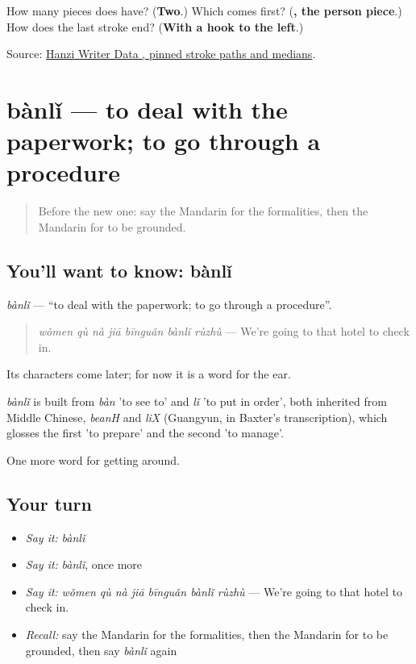 \begin{tcolorbox}[breakable,colback=teal!4,colframe=teal!35!black,title={Before you move on}]
How many pieces does  have? (\textbf{Two}.) Which comes first? (\textbf{, the person piece}.) How does the last stroke end? (\textbf{With a hook to the left}.)

Source: \href{https://raw.githubusercontent.com/chanind/hanzi-writer-data/68d10a4b21150cae5e1ebbd223eed289cf32d90c/data/\%E5\%81\%9C.json}{Hanzi Writer Data , pinned stroke paths and medians}.
\end{tcolorbox}
\section[bànlǐ]{bànlǐ — to deal with the paperwork; to go through a procedure}

\label{lesson:ZH-C418-banli}



\begin{quote}
Before the new one: say the Mandarin for the formalities, then the Mandarin for to be grounded.
\end{quote}

\subsection*{You'll want to know: bànlǐ}
\emph{bànlǐ} — \textquotedblleft{}to deal with the paperwork; to go through a procedure\textquotedblright{}.

\begin{quote}
\emph{wǒmen qù nà jiā bīnguǎn bànlǐ rùzhù} — We're going to that hotel to check in.
\end{quote}

Its characters come later; for now it is a word for the ear.

\begin{cousinweb}
\emph{bànlǐ} is built from \emph{bàn} 'to see to' and \emph{lǐ} 'to put in order', both inherited from Middle Chinese, \emph{beanH} and \emph{liX} (Guangyun, in Baxter's transcription), which glosses the first 'to prepare' and the second 'to manage'.
\end{cousinweb}

\begin{grammarlens}[title={What you've built}]
One more word for getting around.
\end{grammarlens}

\subsection*{Your turn}
\begin{itemize}
\raggedright
  \item \emph{Say it:} \emph{bànlǐ}
  \item \emph{Say it:} \emph{bànlǐ}, once more
  \item \emph{Say it:} \emph{wǒmen qù nà jiā bīnguǎn bànlǐ rùzhù} — We're going to that hotel to check in.
  \item \emph{Recall:} say the Mandarin for the formalities, then the Mandarin for to be grounded, then say \emph{bànlǐ} again
\end{itemize}

